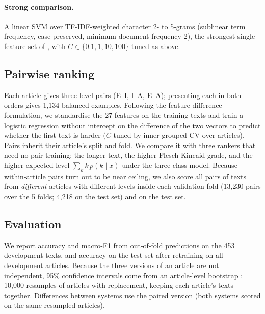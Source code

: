 \paragraph{Strong comparison.}
A linear SVM over TF-IDF-weighted character 2- to 5-grams (sublinear term frequency, case preserved, minimum document frequency 2), the strongest single feature set of \citet{vajjala2018onestop}, with $C \in \{0.1, 1, 10, 100\}$ tuned as above.

\subsection{Pairwise ranking}
Each article gives three level pairs (E--I, I--A, E--A); presenting each in both orders gives 1,134 balanced examples. Following the feature-difference formulation, we standardise the 27 features on the training texts and train a logistic regression without intercept on the difference of the two vectors to predict whether the first text is harder ($C$ tuned by inner grouped CV over articles). Pairs inherit their article's split and fold. We compare it with three rankers that need no pair training: the longer text, the higher Flesch-Kincaid grade, and the higher expected level $\sum_k k\,p(k \mid x)$ under the three-class model. Because within-article pairs turn out to be near ceiling, we also score all pairs of texts from \emph{different} articles with different levels inside each validation fold (13,230 pairs over the 5 folds; 4,218 on the test set) and on the test set.

\subsection{Evaluation}
We report accuracy and macro-F1 from out-of-fold predictions on the 453 development texts, and accuracy on the test set after retraining on all development articles. Because the three versions of an article are not independent, 95\% confidence intervals come from an article-level bootstrap \citep{efron1993bootstrap}: 10,000 resamples of articles with replacement, keeping each article's texts together. Differences between systems use the paired version (both systems scored on the same resampled articles).
